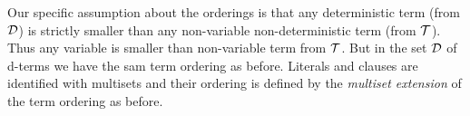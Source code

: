 Our specific assumption about the orderings is that any deterministic term
(from ${\cal D}$) is strictly smaller than any non-variable non-deterministic
term (from \({\cal T}\)). Thus any variable is smaller than non-variable term
from ${\cal T}$.  But in the set ${\cal D}$ of d-terms we have the sam
term ordering as before.
Literals and clauses are identified with multisets and their ordering
is defined by the {\em multiset extension} \cite{DM} of the term
ordering as before.
%
%

